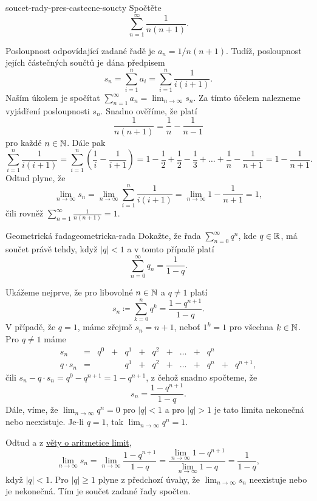 \begin{problem}{}{soucet-rady-pres-castecne-soucty}
 Spočtěte
 \[
  \sum_{n=1}^{\infty} \frac{1}{n(n+1)}.
 \]
\end{problem}
\begin{probsol}
 Posloupnost odpovídající zadané řadě je $a_n = 1 / n(n+1)$. Tudíž, posloupnost
 jejích částečných součtů je dána předpisem
 \[
  s_n = \sum_{i=1}^{n} a_i = \sum_{i=1}^n \frac{1}{i(i+1)}.
 \]
 Naším úkolem je spočítat $\sum_{n=1}^{\infty} a_n = \lim_{n \to \infty} s_n$.
 Za tímto účelem nalezneme  vyjádření posloupnosti $s_n$. Snadno
 ověříme, že platí
 \[
  \frac{1}{n(n+1)} = \frac{1}{n} - \frac{1}{n-1}
 \]
 pro každé $n \in \mathbb{N}$. Dále pak
 \[
  \sum_{i = 1}^{n} \frac{1}{i(i+1)} = \sum_{i=1}^n \left( \frac{1}{i} -
  \frac{1}{i+1} \right) = 1 - \frac{1}{2} + \frac{1}{2} - \frac{1}{3} + \ldots +
  \frac{1}{n} - \frac{1}{n + 1} = 1 - \frac{1}{n+1}.
 \]
 Odtud plyne, že
 \[
  \lim_{n \to \infty} s_n = \lim_{n \to \infty} \sum_{i = 1}^{n}
  \frac{1}{i(i+1)} = \lim_{n \to \infty} 1 - \frac{1}{n+1} = 1,
 \]
 čili rovněž $\sum_{n=1}^{\infty} \frac{1}{n(n+1)} = 1$.
\end{probsol}

\begin{problem}{Geometrická řada}{geometricka-rada}
 Dokažte, že řada $\sum_{n=0}^{\infty} q^{n}$, kde $q \in \mathbb{R}$, má součet právě
 tehdy, když $|q| < 1$ a v tomto případě platí
 \[
  \sum_{n=0}^{\infty} q_n = \frac{1}{1-q}.
 \]
\end{problem}
\begin{probsol}
 Ukážeme nejprve, že pro libovolné $n \in \mathbb{N}$ a $q \neq 1$ platí
 \[
  s_n \coloneqq \sum_{k=0}^n q^{k} = \frac{1 - q^{n+1}}{1 - q}.
 \]
 V případě, že $q = 1$, máme zřejmě $s_n = n + 1$, neboť $1^{k} = 1$ pro všechna
 $k \in \mathbb{N}$. Pro $q \neq 1$ máme 
 \begin{equation*}
  \begin{array}{ccccccccccccc}
   s_n & = & q^{0} & + & q^{1} & + & q^{2} & + & \ldots & + & q^{n} & &\\
   q \cdot s_n & = & & & q^{1} & + & q^2 & + & \ldots & + & q^{n} & + & q^{n+1},
  \end{array}
 \end{equation*}
 čili $s_n - q \cdot s_n = q^{0} - q^{n+1} = 1 - q^{n+1}$, z čehož snadno
 spočteme, že
 \[
  s_n = \frac{1-q^{n+1}}{1 - q}.
 \]
 Dále, víme, že $\lim_{n \to \infty} q^{n} = 0$ pro $|q| < 1$ a pro $|q| > 1$ je
 tato limita nekonečná nebo neexistuje. Je-li $q = 1$, tak $\lim_{n \to \infty}
 q^{n} = 1$.

 Odtud a z \hyperref[thm:aritmetika-limit]{věty o aritmetice limit},
 \[
  \lim_{n \to \infty} s_n = \lim_{n \to \infty} \frac{1-q^{n+1}}{1-q} =
  \frac{\lim_{n \to \infty} 1-q^{n+1}}{\lim_{n \to \infty} 1-q} = \frac{1}{1-q},
 \]
 když $|q| < 1$. Pro $|q| \geq 1$ plyne z předchozí úvahy, že $\lim_{n \to
 \infty} s_n$ neexistuje nebo je nekonečná. Tím je součet zadané řady spočten.
\end{probsol}

